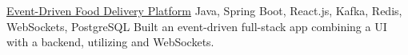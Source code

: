 \cvprojectsingle
{\href{https://github.com/UchihaIthachi/Food-Delivery-App}{Event-Driven Food Delivery Platform} }
{Java, Spring Boot, React.js, Kafka, Redis, WebSockets, PostgreSQL}
{Built an event-driven full-stack app combining a  UI with a  backend, utilizing  and WebSockets.}